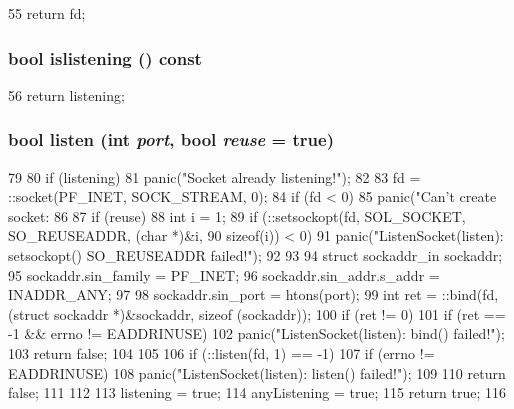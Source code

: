 \begin{DoxyCode}
55 { return fd; }
\end{DoxyCode}
\hypertarget{classListenSocket_a2848e5513ce657609b8210b7d23e4f6b}{
\subsubsection[{islistening}]{\setlength{\rightskip}{0pt plus 5cm}bool islistening () const}}
\label{classListenSocket_a2848e5513ce657609b8210b7d23e4f6b}



\begin{DoxyCode}
56 { return listening; }
\end{DoxyCode}
\hypertarget{classListenSocket_adc0204f049c93d5c4ed27c604d1127a4}{
\subsubsection[{listen}]{\setlength{\rightskip}{0pt plus 5cm}bool listen (int {\em port}, \/  bool {\em reuse} = {\ttfamily true})}}
\label{classListenSocket_adc0204f049c93d5c4ed27c604d1127a4}



\begin{DoxyCode}
79 {
80     if (listening)
81         panic("Socket already listening!");
82 
83     fd = ::socket(PF_INET, SOCK_STREAM, 0);
84     if (fd < 0)
85         panic("Can't create socket:%
86 
87     if (reuse) {
88         int i = 1;
89         if (::setsockopt(fd, SOL_SOCKET, SO_REUSEADDR, (char *)&i,
90                          sizeof(i)) < 0)
91             panic("ListenSocket(listen): setsockopt() SO_REUSEADDR failed!");
92     }
93 
94     struct sockaddr_in sockaddr;
95     sockaddr.sin_family = PF_INET;
96     sockaddr.sin_addr.s_addr = INADDR_ANY;
97 
98     sockaddr.sin_port = htons(port);
99     int ret = ::bind(fd, (struct sockaddr *)&sockaddr, sizeof (sockaddr));
100     if (ret != 0) {
101         if (ret == -1 && errno != EADDRINUSE)
102             panic("ListenSocket(listen): bind() failed!");
103         return false;
104     }
105 
106     if (::listen(fd, 1) == -1) {
107         if (errno != EADDRINUSE)
108             panic("ListenSocket(listen): listen() failed!");
109 
110         return false;
111     }
112 
113     listening = true;
114     anyListening = true;
115     return true;
116 }
\end{DoxyCode}


